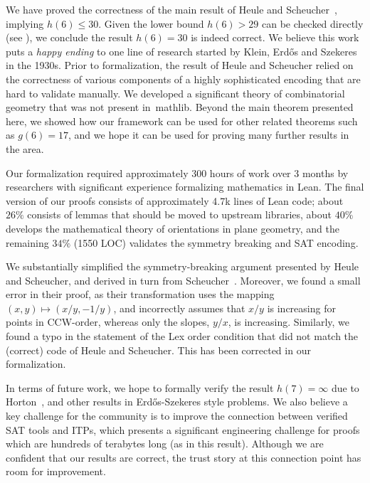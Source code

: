 We have proved the correctness of the main result of Heule and Scheucher~\cite{emptyHexagonNumber},
implying $h(6) \leq 30$.
Given the lower bound $h(6) > 29$ can be checked directly (see \cite{emptyHexagonNumber}),
we conclude the result $h(6) = 30$ is indeed correct.
We believe this work puts a \emph{happy ending} to
one line of research started by Klein, Erd\H{o}s and Szekeres in the 1930s.
Prior to formalization, the result of Heule and Scheucher
relied on the correctness of various components of a highly sophisticated encoding
that are hard to validate manually.
We developed a significant theory of combinatorial geometry
that was not present in~\textsf{mathlib}.
Beyond the main theorem presented here,
we showed how our framework can be used for other related theorems
such as $g(6) = 17$,
and we hope it can be used for proving many further results in the area.

Our formalization required approximately 300 hours of work over 3 months
by researchers with significant experience formalizing mathematics in Lean.
The final version of our proofs consists of approximately 4.7k lines of Lean code;
about $26\%$ consists of lemmas that should be moved to upstream libraries,
about $40\%$ develops the mathematical theory of orientations in plane geometry,
and the remaining $34\%$ (1550 LOC) validates the symmetry breaking and SAT encoding.

We substantially simplified the symmetry-breaking argument presented by Heule and Scheucher,
and derived in turn from Scheucher~\cite{scheucherTwoDisjoint5holes2020}.
Moreover, we found a small error in their proof,
as their transformation uses the mapping $(x, y) \mapsto (x/y, -1/y)$,
and incorrectly assumes that $x/y$ is increasing for points in CCW-order,
whereas only the slopes, $y/x$, is increasing.
Similarly, we found a typo in the statement of the \textsf{Lex order} condition
that did not match the (correct) code of Heule and Scheucher.
This has been corrected in our formalization.

In terms of future work,
we hope to formally verify the result $h(7) = \infty$ due to Horton~\cite{hortonSetsNoEmpty1983},
and other results in Erd\H{o}s-Szekeres style problems.
We also believe a key challenge for the community
is to improve the connection between verified SAT tools and ITPs,
which presents a significant engineering challenge
for proofs which are hundreds of terabytes long (as in this result).
Although we are confident that our results are correct,
the trust story at this connection point has room for improvement.
